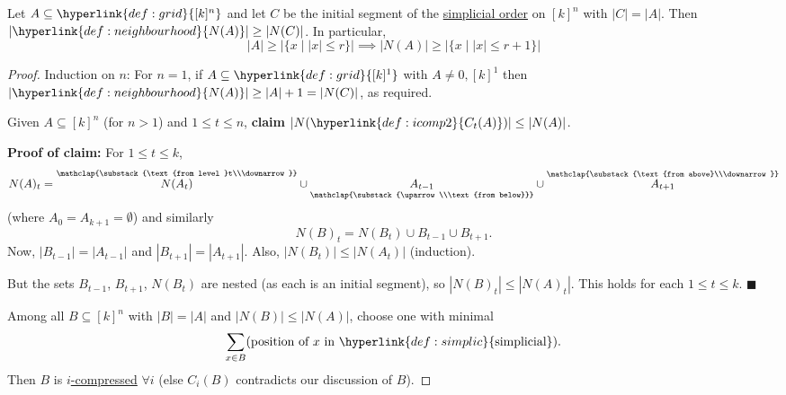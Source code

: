 \documentclass{article}
\let\subset\subseteq
\begin{document}
\begin{nthm}
  Let $A \subseteq \hyperlink{def:grid}{[k]^n}$ and let $C$ be the initial segment of the \hyperlink{def:simplic}{simplicial order} on $[k]^n$ with $|C| = |A|$.
  Then $|\hyperlink{def:neighbourhood}{N(A)}| \geq |N(C)|$.
  In particular,
  \begin{equation*}|A| \geq |\{x \mid |x|\leq r\}| \implies |N(A)| \geq |\{x \mid |x| \leq r+1\}|\end{equation*}
\end{nthm}
\begin{proof}
  Induction on $n$:
  For $n=1$, if $A \subset \hyperlink{def:grid}{[k]^1}$ with $A \neq 0, [k]^1$ then $|\hyperlink{def:neighbourhood}{N(A)}| \geq |A|+1 = |N(C)|$, as required.

  Given $A \subset [k]^n$ (for $n > 1$) and $1 \leq t \leq n$,
  \textbf{claim} $|N(\hyperlink{def:icomp2}{C_t(A)})| \leq |N(A)|$.

  \textbf{Proof of claim:}
  For $1 \leq t \leq k$,
  \begin{equation*}
    N(A)_t = \overset{\mathclap{\substack{\text{from level }t\\\downarrow}}}{N(A_t)} \cup \underset{\mathclap{\substack{\uparrow\\\text{from below}}}}{A_{t-1}} \cup \overset{\mathclap{\substack{\text{from above}\\\downarrow}}}{A_{t+1}}
  \end{equation*}
  (where $A_0 = A_{k+1}=\emptyset$) and similarly
  \begin{equation*}
    N(B)_t = N(B_t) \cup B_{t-1} \cup B_{t+1}.
  \end{equation*}
  Now, $|B_{t-1}| = |A_{t-1}|$ and $|B_{t+1}| = |A_{t+1}|$.
  Also, $|N(B_t)| \leq |N(A_t)|$ (induction).

  But the sets $B_{t-1}$, $B_{t+1}$, $N(B_t)$ are nested (as each is an initial segment), so $|N(B)_t| \leq |N(A)_t|$.
  This holds for each $1 \leq t \leq k$. $\blacksquare$

  Among all $B \subseteq [k]^n$ with $|B| = |A|$ and $|N(B)| \leq |N(A)|$, choose one with minimal
  \begin{equation*}
    \sum_{x \in B} (\text{position of $x$ in }\hyperlink{def:simplic}{\text{simplicial}}).
  \end{equation*}
  Then $B$ is \hyperlink{def:icomp2}{$i$-compressed} $\forall i$ (else $C_i(B)$ contradicts our discussion of $B$).


\end{proof}
\end{document}
